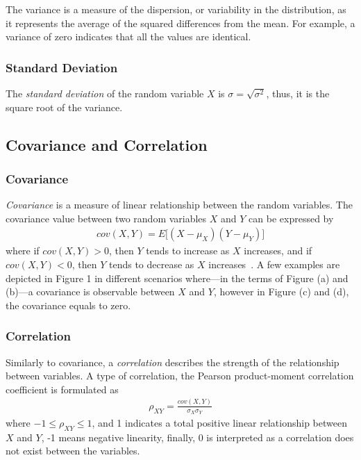 The variance is a measure of the dispersion, or variability in the distribution, as it represents the average of the squared differences from the mean. For example, a variance of zero indicates that all the values are identical.

\subsubsection{Standard Deviation}

The \textit{standard deviation} of the random variable $X$ is $\sigma = \sqrt{\sigma^2}$, thus, it is the square root of the variance.

\subsection{Covariance and Correlation}

\subsubsection{Covariance}
\textit{Covariance} is a measure of linear relationship between the random variables. The covariance value between two random variables $X$ and $Y$ can be expressed by
\begin{align}
	cov(X,Y) = E\big[(X - \mu_X)(Y - \mu_Y)\big]
\end{align}
where if $cov(X,Y) > 0$, then $Y$ tends to increase as $X$ increases, and if $cov(X,Y) < 0$, then $Y$ tends to decrease as $X$ increases~\cite{covariance}. A few examples are depicted in Figure 1 %
in different scenarios where---in the terms of Figure (a) and (b)---a covariance is observable between $X$ and $Y$, however in Figure (c) and (d), the covariance equals to zero.

\subsubsection{Correlation}
Similarly to covariance, a \textit{correlation} describes the strength of the relationship between variables. A type of correlation, the Pearson product-moment correlation coefficient is formulated as
\begin{align}
	\rho_{XY} = \frac{cov(X, Y)}{\sigma_X\sigma_Y}
\end{align}
where $ -1 \leq \rho_{XY} \leq 1$, and 1 indicates a total positive linear relationship between $X$ and $Y$, -1 means negative linearity, finally, 0 is interpreted as a correlation does not exist between the variables.

